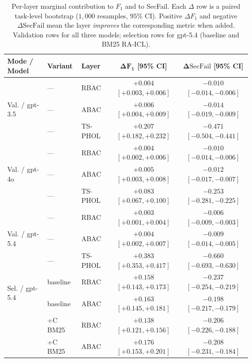 \documentclass[10pt,a4paper,twocolumn]{article}
\begin{document}
\begin{table}[!t]
\centering
\caption{Per-layer marginal contribution to $F_1$ and to SecFail. Each $\Delta$ row is a paired task-level bootstrap ($1{,}000$ resamples, $95\%$ CI). Positive $\Delta F_1$ and negative $\Delta\mathrm{SecFail}$ mean the layer \emph{improves} the corresponding metric when added. Validation rows for all three models; selection rows for gpt-5.4 (baseline and BM25 RA-ICL).}
\label{tab:per_layer_delta}
\scriptsize
\setlength{\tabcolsep}{2.4pt}
\begin{tabular}{@{}lllcc@{}}
\toprule
\textbf{Mode / Model} & \textbf{Variant} & \textbf{Layer} & $\boldsymbol{\Delta F_1}$ \textbf{[95\% CI]} & $\boldsymbol{\Delta\mathrm{SecFail}}$ \textbf{[95\% CI]} \\
\midrule
\multirow{3}{*}{Val. / gpt-3.5}
 & --- & RBAC    & $+0.004$ $[+0.003, +0.006]$ & $-0.010$ $[-0.014, -0.006]$ \\
 & --- & ABAC    & $+0.006$ $[+0.004, +0.009]$ & $-0.014$ $[-0.019, -0.009]$ \\
 & --- & TS-PHOL & $\mathbf{+0.207}$ $[+0.182, +0.232]$ & $\mathbf{-0.471}$ $[-0.504, -0.441]$ \\
\midrule
\multirow{3}{*}{Val. / gpt-4o}
 & --- & RBAC    & $+0.004$ $[+0.002, +0.006]$ & $-0.010$ $[-0.014, -0.006]$ \\
 & --- & ABAC    & $+0.005$ $[+0.003, +0.008]$ & $-0.012$ $[-0.017, -0.007]$ \\
 & --- & TS-PHOL & $\mathbf{+0.083}$ $[+0.067, +0.100]$ & $\mathbf{-0.253}$ $[-0.281, -0.225]$ \\
\midrule
\multirow{3}{*}{Val. / gpt-5.4}
 & --- & RBAC    & $+0.003$ $[+0.001, +0.004]$ & $-0.006$ $[-0.009, -0.003]$ \\
 & --- & ABAC    & $+0.004$ $[+0.002, +0.007]$ & $-0.009$ $[-0.014, -0.005]$ \\
 & --- & TS-PHOL & $\mathbf{+0.383}$ $[+0.353, +0.417]$ & $\mathbf{-0.660}$ $[-0.693, -0.630]$ \\
\midrule
\multirow{2}{*}{Sel. / gpt-5.4} & baseline & RBAC & $\mathbf{+0.158}$ $[+0.143, +0.173]$ & $\mathbf{-0.237}$ $[-0.254, -0.219]$ \\
                                & baseline & ABAC & $+0.163$ $[+0.145, +0.181]$ & $-0.198$ $[-0.217, -0.179]$ \\
\multirow{2}{*}{}                & +C BM25 & RBAC & $+0.138$ $[+0.121, +0.156]$ & $-0.206$ $[-0.226, -0.188]$ \\
                                & +C BM25 & ABAC & $\mathbf{+0.176}$ $[+0.153, +0.201]$ & $\mathbf{-0.208}$ $[-0.231, -0.184]$ \\
\bottomrule
\end{tabular}
\end{table}
\end{document}
